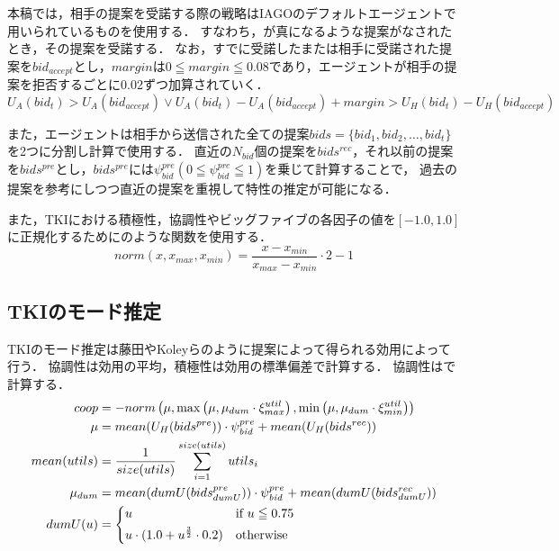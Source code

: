 本稿では，相手の提案を受諾する際の戦略はIAGOのデフォルトエージェントで用いられているものを使用する．
すなわち，が真になるような提案がなされたとき，その提案を受諾する．
なお，すでに受諾したまたは相手に受諾された提案を$bid_{accept}$とし，$margin$は$0 \leqq margin \leqq 0.08$であり，エージェントが相手の提案を拒否するごとに0.02ずつ加算されていく．
\begin{equation}
    U_A(bid_t) > U_A(bid_{accept}) \vee  U_A(bid_t) - U_A(bid_{accept}) + margin > U_H(bid_t) - U_H(bid_{accept}) 
    \label{eq:acceptance}
\end{equation}

また，エージェントは相手から送信された全ての提案$bids = \{ bid_1, bid_2, \ldots , bid_t \}$を2つに分割し計算で使用する．
直近の$N_{\mathit{bid}}$個の提案を$bids^{rec}$，それ以前の提案を$bids^{pre}$とし，$bids^{pre}$には$\psi_{\mathit{bid}}^{pre}(0 \leqq \psi_{\mathit{bid}}^{pre} \leqq 1)$を乗じて計算することで，
過去の提案を参考にしつつ直近の提案を重視して特性の推定が可能になる．

また，TKIにおける積極性，協調性やビッグファイブの各因子の値を$[-1.0, 1.0]$に正規化するためにのような関数を使用する．
\begin{equation}
    norm(x, x_{max}, x_{min}) = \frac{x - x_{min}}{x_{max} - x_{min}} \cdot 2 - 1
    \label{eq:normarize}
\end{equation}

\subsection{TKIのモード推定}
TKIのモード推定は藤田\cite{tki-aa}やKoleyら\cite{tki-ha}のように提案によって得られる効用によって行う．
協調性は効用の平均，積極性は効用の標準偏差で計算する．
協調性はで計算する．
\begin{align}
    coop &= -norm \left(\mu, \max \left( \mu, \mu_{dum} \cdot \xi_{max}^{util}\right) , \min \left( \mu, \mu_{dum} \cdot \xi_{min}^{util} \right) \right) \label{eq:cooperativeness} \\
    \mu &= mean(U_H(bids^{pre})) \cdot \psi_{\mathit{bid}}^{pre} + mean(U_H(bids^{rec})) \nonumber \\
    mean(utils) &= \frac{1}{size(utils)}\sum_{i = 1}^{size(utils)} utils_i \nonumber \\
    \mu_{dum} &= mean(dumU(bids_{dumU}^{pre})) \cdot \psi_{\mathit{bid}}^{pre} + mean(dumU(bids_{dumU}^{rec})) \nonumber \\
    dumU(u) &=
    \begin{cases*}
        u & if $u \leqq 0.75$ \\
        u \cdot (1.0 + u^{\frac{3}{2}} \cdot 0.2) & otherwise \\
    \end{cases*} \label{eq:dummyMean}
\end{align}

